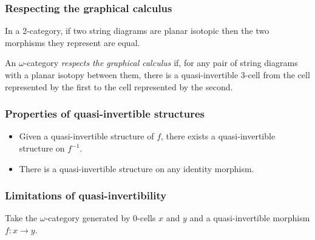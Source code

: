\documentclass[presentation]{beamer}
\newcommand{\inv}[1]{#1^{-1}}
\begin{document}
\begin{frame}
  \frametitle{Respecting the graphical calculus}
  \begin{theorem}
    In a 2-category, if two string diagrams are planar isotopic then the two morphisms they represent are equal.
  \end{theorem}
  \pause{}
  \begin{definition}
    An \(\omega\)-category \emph{respects the graphical calculus} if, for any pair of string diagrams with a planar isotopy between them, there is a quasi-invertible \(3\)-cell from the cell represented by the first to the cell represented by the second.
  \end{definition}
\end{frame}

\begin{frame}
  \frametitle{Properties of quasi-invertible structures}
  \begin{itemize}
  \item Given a quasi-invertible structure of \(f\), there exists a quasi-invertible structure on \(\inv f\).
  \item There is a quasi-invertible structure on any identity morphism.
  \end{itemize}
\end{frame}

\begin{frame}[fragile]
  \frametitle{Limitations of quasi-invertibility}
  Take the \(\omega\)-category generated by \(0\)-cells \(x\) and \(y\) and a quasi-invertible morphism \(f : x \to y\).

  \pause{}
    \begin{center}
  \end{center}
\end{frame}
\end{document}
